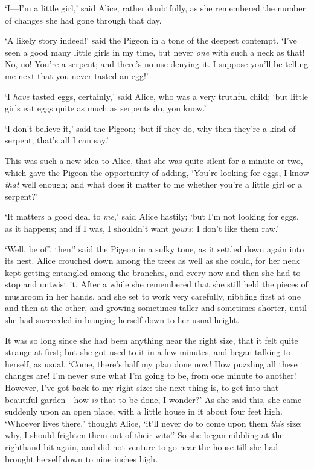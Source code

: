 \documentclass[12pt,openany]{memoir}
\begin{document}
`I---I'm a little girl,' said Alice, rather doubtfully, as she remembered the number of changes she had gone through that day.

`A likely story indeed!' said the Pigeon in a tone of the deepest contempt. `I've seen a good many little girls in my time, but never \textit{one} with such a neck as that! No, no! You're a serpent; and there's no use denying it. I suppose you'll be telling me next that you never tasted an egg!'

`I \textit{have} tasted eggs, certainly,' said Alice, who was a very truthful child; `but little girls eat eggs quite as much as serpents do, you know.'

`I don't believe it,' said the Pigeon; `but if they do, why then they're a kind of serpent, that's all I can say.'

This was such a new idea to Alice, that she was quite silent for a minute or two, which gave the Pigeon the opportunity of adding, `You're looking for eggs, I know \textit{that} well enough; and what does it matter to me whether you're a little girl or a serpent?'

`It matters a good deal to \textit{me},' said Alice hastily; `but I'm not looking for eggs, as it happens; and if I was, I shouldn't want \textit{yours}: I don't like them raw.'

`Well, be off, then!' said the Pigeon in a sulky tone, as it settled down again into its nest. Alice crouched down among the trees as well as she could, for her neck kept getting entangled among the branches, and every now and then she had to stop and untwist it. After a while she remembered that she still held the pieces of mushroom in her hands, and she set to work very carefully, nibbling first at one and then at the other, and growing sometimes taller and sometimes shorter, until she had succeeded in bringing herself down to her usual height.

It was so long since she had been anything near the right size, that it felt quite strange at first; but she got used to it in a few minutes, and began talking to herself, as usual. `Come, there's half my plan done now! How puzzling all these changes are! I'm never sure what I'm going to be, from one minute to another! However, I've got back to my right size: the next thing is, to get into that beautiful garden---how \textit{is} that to be done, I wonder?' As she said this, she came suddenly upon an open place, with a little house in it about four feet high. `Whoever lives there,' thought Alice, `it'll never do to come upon them \textit{this} size: why, I should frighten them out of their wits!' So she began nibbling at the righthand bit again, and did not venture to go near the house till she had brought herself down to nine inches high.
\end{document}
